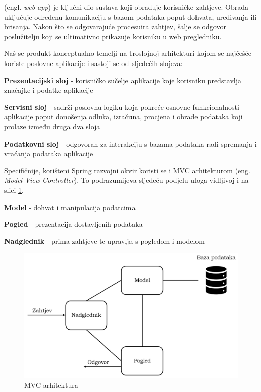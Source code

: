 	\medskip
	
	\noindent {} (engl. \textit{web app}) je ključni dio sustava koji obrađuje korisničke zahtjeve. Obrada uključuje određenu komunikaciju s bazom podataka poput dohvata, uređivanja ili brisanja. Nakon što se odgovarajuće procesuira zahtjev, šalje se odgovor poslužitelju koji se ultimativno prikazuje korisniku u web pregledniku. \par
	
	
	
	\bigskip    
	
	
	
	\noindent Naš se produkt konceptualno temelji na troslojnoj arhitekturi kojom se najčešće koriste poslovne aplikacije i sastoji se od sljedećih slojeva:
	 \begin{packed_enum}
	        \item \textbf{Prezentacijski sloj} - korisničko sučelje aplikacije koje korisniku predstavlja značajke i podatke aplikacije
	        \item \textbf{Servisni sloj} - sadrži poslovnu logiku koja pokreće osnovne funkcionalnosti aplikacije poput donošenja odluka, izračuna, procjena i obrade podataka koji prolaze između druga dva sloja
	        \item \textbf{Podatkovni sloj} - odgovoran za interakciju s bazama podataka radi spremanja i vraćanja podataka aplikacije
	    \end{packed_enum}
	
	\bigskip
	
	\noindent Specifičnije, korišteni Spring razvojni okvir koristi se i MVC arhitekturom (eng. \textit{Model-View-Controller}). To podrazumijeva sljedeću podjelu uloga vidljivoj i na slici \ref{fig:mvc}.
	 \begin{packed_item}
	        \item \textbf{Model} - dohvat i manipulacija podatcima
	        \item \textbf{Pogled} - prezentacija dostavljenih podataka
	        \item \textbf{Nadglednik}  - prima zahtjeve te upravlja s pogledom i modelom
	 \end{packed_item}
	 
	\begin{figure}[H]
		\includegraphics[scale=0.55]{slike/mvc-architecture.PNG} 
		\centering
		\caption{MVC arhitektura}
		\label{fig:mvc}
	\end{figure}
	
